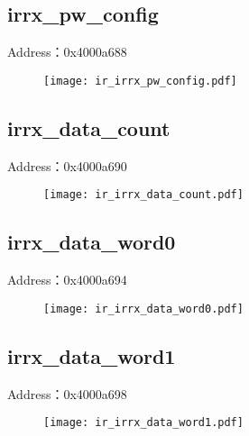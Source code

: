 \subsection{irrx\_pw\_config}
\label{ir-irrx-pw-config}
Address：0x4000a688
 \begin{figure}[H]
\texttt{[image: ir\_irrx\_pw\_config.pdf]}
\end{figure}

\subsection{irrx\_data\_count}
\label{ir-irrx-data-count}
Address：0x4000a690
 \begin{figure}[H]
\texttt{[image: ir\_irrx\_data\_count.pdf]}
\end{figure}

\subsection{irrx\_data\_word0}
\label{ir-irrx-data-word0}
Address：0x4000a694
 \begin{figure}[H]
\texttt{[image: ir\_irrx\_data\_word0.pdf]}
\end{figure}

\subsection{irrx\_data\_word1}
\label{ir-irrx-data-word1}
Address：0x4000a698
 \begin{figure}[H]
\texttt{[image: ir\_irrx\_data\_word1.pdf]}
\end{figure}

